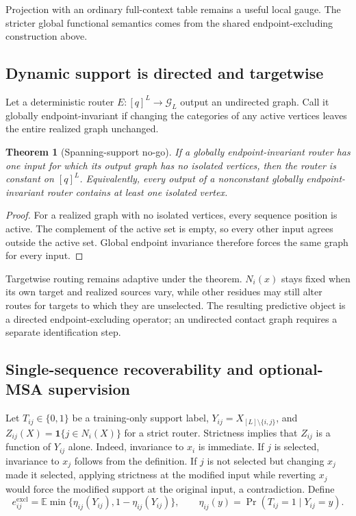 \documentclass[10pt]{article}
\newcommand{\E}{\mathbb E}
\newtheorem{theorem}{Theorem}[section]
\theoremstyle{definition}
\theoremstyle{remark}
\newcommand{\BookInsert}[1]{}
\newcommand{\BookSection}[1]{\subsection{#1}}
\begin{document}
Projection with an ordinary full-context table remains a useful local gauge.  The stricter global
functional semantics comes from the shared endpoint-excluding construction above.

\BookSection{Dynamic support is directed and targetwise}

Let a deterministic router $E:[q]^L\to\mathcal G_L$ output an undirected graph.  Call it globally
endpoint-invariant if changing the categories of any active vertices leaves the entire realized
graph unchanged.

\begin{theorem}[Spanning-support no-go]
\label{thm:global-support-no-go}
If a globally endpoint-invariant router has one input for which its output graph has no isolated
vertices, then the router is constant on $[q]^L$.  Equivalently, every output of a nonconstant
globally endpoint-invariant router contains at least one isolated vertex.
\end{theorem}

\begin{proof}
For a realized graph with no isolated vertices, every sequence position is active.  The complement
of the active set is empty, so every other input agrees outside the active set.  Global endpoint
invariance therefore forces the same graph for every input.
\end{proof}

Targetwise routing remains adaptive under the theorem.  $N_i(x)$ stays fixed when its own target
and realized sources vary, while other residues may still alter routes for targets to which they
are unselected.  The resulting predictive object is a directed endpoint-excluding operator; an undirected
contact graph requires a separate identification step.

\BookInsert{chapters/13_bayes_error_primer}

\BookSection{Single-sequence recoverability and optional-MSA supervision}

Let $T_{ij}\in\{0,1\}$ be a training-only support label,
$Y_{ij}=X_{[L]\setminus\{i,j\}}$, and
$Z_{ij}(X)=\mathbf1\{j\in N_i(X)\}$ for a strict router.  Strictness implies that $Z_{ij}$ is a
function of $Y_{ij}$ alone.  Indeed, invariance to $x_i$ is immediate.  If $j$ is selected,
invariance to $x_j$ follows from the definition.  If $j$ is not selected but changing $x_j$ made it
selected, applying strictness at the modified input while reverting $x_j$ would force the modified
support at the original input, a contradiction.  Define
\begin{equation}
e_{ij}^{\mathrm{excl}}
=\E\min\{\eta_{ij}(Y_{ij}),1-\eta_{ij}(Y_{ij})\},
\qquad
\eta_{ij}(y)=\Pr(T_{ij}=1\mid Y_{ij}=y).
\label{eq:cavity-bayes-floor}
\end{equation}
\end{document}
